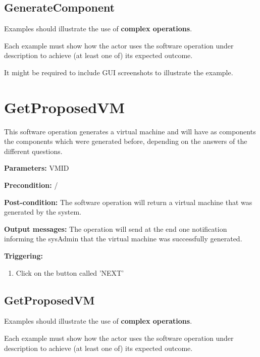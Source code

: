 \subsection{GenerateComponent}
Examples should illustrate the use of \textbf{complex operations}.

Each example must show how the actor uses the software operation under
description to achieve (at least one of) its expected outcome.

It might be required to include GUI screenshots to illustrate the example.









\section{GetProposedVM}
\label{operation:GetProposedVM}
This software operation generates a virtual machine and will have as components
the components which were generated before, depending on the answers of the
different questions.
\begin{description}

\item \textbf{Parameters:} VMID
\item \textbf{Precondition:} /
\item \textbf{Post-condition:} The software operation will return a virtual
machine that was generated by the system.
\item \textbf{Output messages:} The operation will send at the end one
notification informing the sysAdmin that the virtual machine was successfully
generated.

\item \textbf{Triggering:}
\begin{enumerate}
\item Click on the button called 'NEXT'
\end{enumerate}

 
\end{description}

\subsection{GetProposedVM}
Examples should illustrate the use of \textbf{complex operations}.

Each example must show how the actor uses the software operation under
description to achieve (at least one of) its expected outcome.

